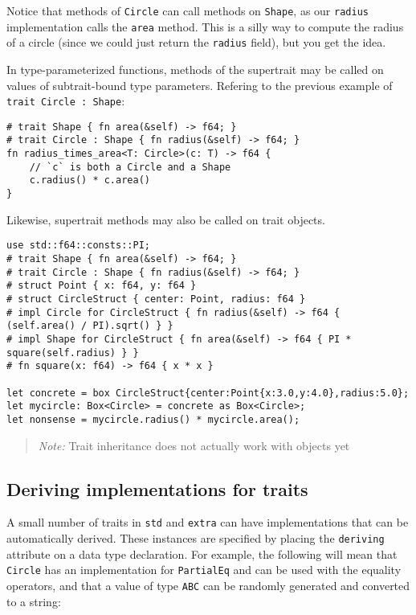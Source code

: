\documentclass[]{article}
\begin{document}
Notice that methods of \texttt{Circle} can call methods on
\texttt{Shape}, as our \texttt{radius} implementation calls the
\texttt{area} method. This is a silly way to compute the radius of a
circle (since we could just return the \texttt{radius} field), but you
get the idea.

In type-parameterized functions, methods of the supertrait may be called
on values of subtrait-bound type parameters. Refering to the previous
example of \texttt{trait Circle : Shape}:

\begin{verbatim}
# trait Shape { fn area(&self) -> f64; }
# trait Circle : Shape { fn radius(&self) -> f64; }
fn radius_times_area<T: Circle>(c: T) -> f64 {
    // `c` is both a Circle and a Shape
    c.radius() * c.area()
}
\end{verbatim}

Likewise, supertrait methods may also be called on trait objects.

\begin{verbatim}
use std::f64::consts::PI;
# trait Shape { fn area(&self) -> f64; }
# trait Circle : Shape { fn radius(&self) -> f64; }
# struct Point { x: f64, y: f64 }
# struct CircleStruct { center: Point, radius: f64 }
# impl Circle for CircleStruct { fn radius(&self) -> f64 { (self.area() / PI).sqrt() } }
# impl Shape for CircleStruct { fn area(&self) -> f64 { PI * square(self.radius) } }
# fn square(x: f64) -> f64 { x * x }

let concrete = box CircleStruct{center:Point{x:3.0,y:4.0},radius:5.0};
let mycircle: Box<Circle> = concrete as Box<Circle>;
let nonsense = mycircle.radius() * mycircle.area();
\end{verbatim}

\begin{quote}
\emph{Note:} Trait inheritance does not actually work with objects yet
\end{quote}

\subsection{Deriving implementations for
traits}\label{deriving-implementations-for-traits}

A small number of traits in \texttt{std} and \texttt{extra} can have
implementations that can be automatically derived. These instances are
specified by placing the \texttt{deriving} attribute on a data type
declaration. For example, the following will mean that \texttt{Circle}
has an implementation for \texttt{PartialEq} and can be used with the
equality operators, and that a value of type \texttt{ABC} can be
randomly generated and converted to a string:
\end{document}
